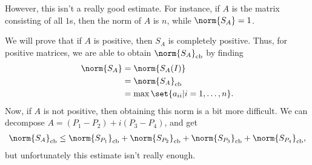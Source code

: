 \documentclass[10pt]{mypackage}
\DeclareMathOperator{\cb}{cb}
\begin{document}
However, this isn't a really good estimate. For instance, if $A$ is the matrix consisting of all $1$s, then the norm of $A$ is $n$, while $\norm{S_A} = 1$.\newline

We will prove that if $A$ is positive, then $S_A$ is completely positive. Thus, for positive matrices, we are able to obtain $\norm{S_A}_{\cb}$ by finding
\begin{align*}
  \norm{S_A} &= \norm{S_A(I)}\\
             &= \norm{S_A}_{\cb}\\
             &= \max\set{a_{ii} | i=1,\dots,n}.
\end{align*}
Now, if $A$ is not positive, then obtaining this norm is a bit more difficult. We can decompose $A = \left( P_1 - P_2 \right) + i\left( P_3 - P_4 \right)$, and get
\begin{align*}
  \norm{S_A}_{\cb} \leq \norm{S_{P_1}}_{\cb}  + \norm{S_{P_2}}_{\cb} + \norm{S_{P_3}}_{\cb} + \norm{S_{P_4}}_{\cb},
\end{align*}
but unfortunately this estimate isn't really enough.\newline
\end{document}
